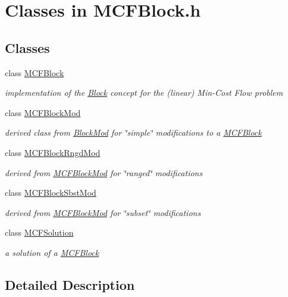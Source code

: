 \hypertarget{group___m_c_f_block___c_l_a_s_s_e_s}{}\section{Classes in M\+C\+F\+Block.\+h}
\label{group___m_c_f_block___c_l_a_s_s_e_s}
\subsection*{Classes}
\begin{DoxyCompactItemize}
\item 
class \mbox{\hyperlink{class_s_m_spp__di__unipi__it_1_1_m_c_f_block}{M\+C\+F\+Block}}
\begin{DoxyCompactList}\small\item\em implementation of the \mbox{\hyperlink{class_s_m_spp__di__unipi__it_1_1_block}{Block}} concept for the (linear) Min-\/\+Cost Flow problem \end{DoxyCompactList}\item 
class \mbox{\hyperlink{class_s_m_spp__di__unipi__it_1_1_m_c_f_block_mod}{M\+C\+F\+Block\+Mod}}
\begin{DoxyCompactList}\small\item\em derived class from \mbox{\hyperlink{class_s_m_spp__di__unipi__it_1_1_block_mod}{Block\+Mod}} for \char`\"{}simple\char`\"{} modifications to a \mbox{\hyperlink{class_s_m_spp__di__unipi__it_1_1_m_c_f_block}{M\+C\+F\+Block}} \end{DoxyCompactList}\item 
class \mbox{\hyperlink{class_s_m_spp__di__unipi__it_1_1_m_c_f_block_rngd_mod}{M\+C\+F\+Block\+Rngd\+Mod}}
\begin{DoxyCompactList}\small\item\em derived from \mbox{\hyperlink{class_s_m_spp__di__unipi__it_1_1_m_c_f_block_mod}{M\+C\+F\+Block\+Mod}} for \char`\"{}ranged\char`\"{} modifications \end{DoxyCompactList}\item 
class \mbox{\hyperlink{class_s_m_spp__di__unipi__it_1_1_m_c_f_block_sbst_mod}{M\+C\+F\+Block\+Sbst\+Mod}}
\begin{DoxyCompactList}\small\item\em derived from \mbox{\hyperlink{class_s_m_spp__di__unipi__it_1_1_m_c_f_block_mod}{M\+C\+F\+Block\+Mod}} for \char`\"{}subset\char`\"{} modifications \end{DoxyCompactList}\item 
class \mbox{\hyperlink{class_s_m_spp__di__unipi__it_1_1_m_c_f_solution}{M\+C\+F\+Solution}}
\begin{DoxyCompactList}\small\item\em a solution of a \mbox{\hyperlink{class_s_m_spp__di__unipi__it_1_1_m_c_f_block}{M\+C\+F\+Block}} \end{DoxyCompactList}\end{DoxyCompactItemize}


\subsection{Detailed Description}
